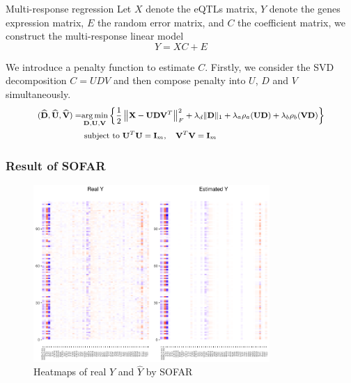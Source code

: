 \begin{frame}{Multi-response regression}
    Let $X$ denote the eQTLs matrix, $Y$ denote the genes expression matrix, $E$ the random error matrix, and $C$ the coefficient matrix, we construct the multi-response linear model
    \begin{equation*}
        Y = XC + E
    \end{equation*}
    
    We introduce a penalty function to estimate $C$. 
    Firstly, we consider the SVD decomposition $C= UDV$ and then compose penalty into $U$, $D$ and $V$ simultaneously. 
    \begin{equation*}\footnotesize
        \begin{split}
            (\widehat{\mathbf{D}}, \widehat{\mathbf{U}}, \widehat{\mathbf{V}})
            = & \underset{\mathbf{D}, \mathbf{U}, \mathbf{V}}{\arg \min }\left\{\frac{1}{2}\left\|\mathbf{X}-\mathbf{U D V}^{T}\right\|_{F}^{2}+\lambda_{d}\|\mathbf{D}\|_{1}+\lambda_{a} \rho_{a}(\mathbf{U D})+\lambda_{b} \rho_{b}(\mathbf{V D})\right\} \\ 
            & \text { subject to } \mathbf{U}^{T} \mathbf{U}=\mathbf{I}_{m}, \quad \mathbf{V}^{T} \mathbf{V}=\mathbf{I}_{m} 
        \end{split}
    \end{equation*}
\end{frame}

\begin{frame}
    \frametitle{Result of SOFAR}
    \begin{figure}[h]
        \centering
        \includegraphics[width=0.8\textwidth]{./figs/heatmap1.pdf}
        \caption{Heatmaps of real $Y$ and $\hat{Y}$ by SOFAR}
    \end{figure}
\end{frame}

